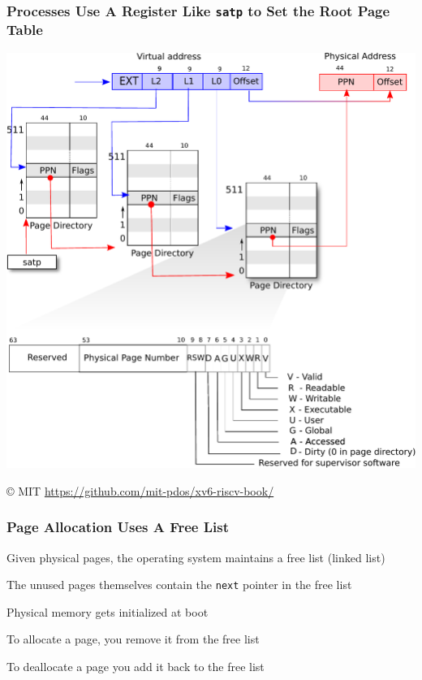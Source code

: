   \begin{frame}
    \frametitle{Processes Use A Register Like \texttt{satp} to Set the Root Page Table}

    \begin{center}
      \includegraphics[scale=0.5, clip, trim=0cm 8cm 0cm 0cm]{../lecture-19/riscv_pagetable.pdf}
    \end{center}

    © MIT \url{https://github.com/mit-pdos/xv6-riscv-book/}
  \end{frame}

  \begin{frame}
    \frametitle{Page Allocation Uses A Free List}

    Given physical pages, the operating system maintains a free list (linked list)

    \vspace{2em}

    The unused pages themselves contain the \texttt{next} pointer in the free list

    \hspace{2em} Physical memory gets initialized at boot

    \vspace{2em}

    To allocate a page, you remove it from the free list

    \hspace{2em} To deallocate a page you add it back to the free list
  \end{frame}

